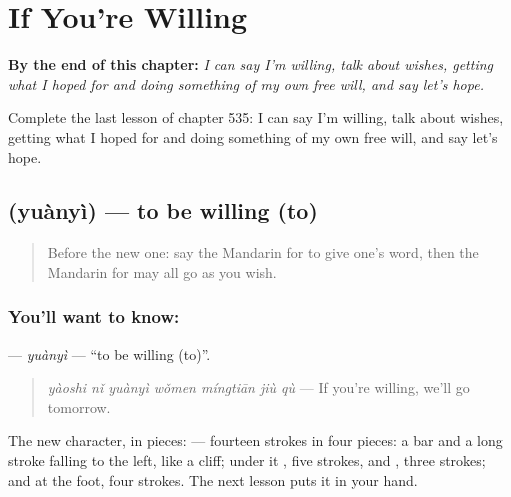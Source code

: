 
\chapter{If You're Willing}
\label{ch:zh-if-you-re-willing}

\begin{chapteropening}
\textbf{By the end of this chapter:} \emph{I can say I'm willing, talk about wishes, getting what I hoped for and doing something of my own free will, and say let's hope.}

Complete the last lesson of chapter 535: I can say I'm willing, talk about wishes, getting what I hoped for and doing something of my own free will, and say let's hope.
\end{chapteropening}

\section[\texorpdfstring{\zh{愿意} (yuànyì)}{愿意 (yuànyì)}]{ (yuànyì) — to be willing (to)}

\label{lesson:ZH-C535-yuanyi}



\begin{quote}
Before the new one: say the Mandarin for to give one's word, then the Mandarin for may all go as you wish.
\end{quote}

\subsection*{You'll want to know: }
\textbf{} — \emph{yuànyì} — \textquotedblleft{}to be willing (to)\textquotedblright{}.

\begin{quote}
\textbf{} \emph{yàoshi nǐ yuànyì wǒmen míngtiān jiù qù} — If you're willing, we'll go tomorrow.
\end{quote}

The new character, in pieces:  — fourteen strokes in four pieces: a bar and a long stroke falling to the left, like a cliff; under it , five strokes, and , three strokes; and  at the foot, four strokes. The next lesson puts it in your hand.

